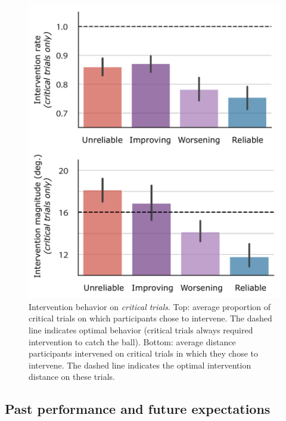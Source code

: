 \documentclass[10pt,letterpaper]{article}
\begin{document}
\begin{figure}[H]
\begin{center}
\includegraphics[width=0.9\linewidth]{img/critical_trial_intervention_summary_vert.pdf}
\end{center}
\caption{Intervention behavior on \textit{critical trials}. 
Top: average proportion of critical trials on which participants chose to intervene. The dashed line indicates optimal behavior (critical trials always required intervention to catch the ball). 
Bottom: average distance participants intervened on critical trials in which they chose to intervene. The dashed line indicates the optimal intervention distance on these trials.} 
\label{fig:critical_trials}
\end{figure}



\subsection{Past performance and future expectations}
\end{document}
